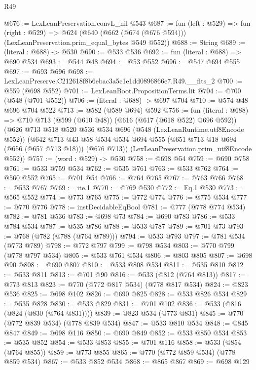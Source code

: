\begin{lexlean}{R49}
\begin{coremodule}
@676 := LexLeanPreservation.convL_nil @543
@687 := fun (left : @529) =>
  fun (right : @529) =>
  @624 (@640 (@662 (@674 (@676 @594))) (LexLeanPreservation.prim_equal_bytes @549 @552))
@688 := String
@689 := (literal : @688) -> @530
@690 := @533 @536
@692 := fun (literal : @688) => @690 @534
@693 := @544 @48
@694 := @53 @552
@696 := @547 @694 @555
@697 := @693 @696
@698 := LexLeanPreserve.C212618f8b6ebac3a5c1e1dd0896866e7.R49.__fits_2
@700 := @559 (@698 @552)
@701 := LexLeanBoot.PropositionTerms.lit
@704 := @700 (@548 (@701 @552))
@706 := (literal : @688) -> @697 @704
@710 := @574 @48 @696 @704 @522
@713 := @582 (@589 @694) @592
@756 := fun (literal : @688) =>
  @710
    @713
    (@599 (@610 @48))
    (@616 (@617 (@618 @522) @696 @592))
    (@626
      @713
      @518
      @520
      @536
      @534
      @696
      (@548 (LexLeanRuntime.utf8Encode @552))
      (@642
        @713
        @43
        @58
        @534
        @534
        @694
        @555
        (@651 @713 @18 @694 (@656 (@657 @713 @18)))
        (@676 @713))
      (LexLeanPreservation.prim_utf8Encode @552))
@757 := (word : @529) -> @530
@758 := @698 @54
@759 := @690 @758
@761 := @533 @759 @534
@762 := @535 @761
@763 := @533 @762
@764 := @560 @552
@765 := @701 @54
@766 := @764 @765
@767 := @763 @766
@768 := @533 @767
@769 := ite.{1}
@770 := @769 @530
@772 := Eq.{1} @530
@773 := @565 @552
@774 := @773 @765
@775 := @772 @774
@776 := @775 @534
@777 := @770 @776
@778 := instDecidableEqBool
@781 := @777 (@778 @774 @534)
@782 := @781 @536
@783 := @698 @73
@784 := @690 @783
@786 := @533 @784 @534
@787 := @535 @786
@788 := @533 @787
@789 := @701 @73
@793 := @768 (@782 (@788 (@764 @789)))
@794 := @533 @793
@797 := @781 @534 (@773 @789)
@798 := @772 @797
@799 := @798 @534
@803 := @770 @799 (@778 @797 @534)
@805 := @533 @761 @534
@806 := @803 @805
@807 := @698 @90
@808 := @690 @807
@810 := @533 @808 @534
@811 := @535 @810
@812 := @533 @811
@813 := @701 @90
@816 := @533 (@812 (@764 @813))
@817 := @773 @813
@823 := @770 (@772 @817 @534) (@778 @817 @534)
@824 := @823 @536
@825 := @698 @102
@826 := @690 @825
@828 := @533 @826 @534
@829 := @535 @828
@830 := @533 @829
@831 := @701 @102
@836 := @533 (@816 (@824 (@830 (@764 @831))))
@839 := @823 @534 (@773 @831)
@845 := @770 (@772 @839 @534) (@778 @839 @534)
@847 := @533 @810 @534
@848 := @845 @847
@849 := @698 @116
@850 := @690 @849
@852 := @533 @850 @534
@853 := @535 @852
@854 := @533 @853
@855 := @701 @116
@858 := @533 (@854 (@764 @855))
@859 := @773 @855
@865 := @770 (@772 @859 @534) (@778 @859 @534)
@867 := @533 @852 @534
@868 := @865 @867
@869 := @698 @129

\end{coremodule}
\end{lexlean}
